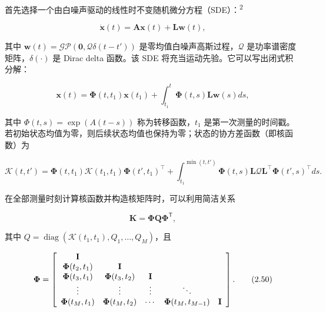 首先选择一个由白噪声驱动的线性时不变随机微分方程（SDE）：\textsuperscript{2}

\begin{equation}
\dot {\boldsymbol {x}} (t) = \boldsymbol {A} \boldsymbol {x} (t) + \boldsymbol {L} \boldsymbol {w} (t),\tag{2.46}
\end{equation}

其中 $\pmb w(t)=\mathcal{GP}(\mathbf0,\pmb{\mathcal{Q}}\delta(t-t'))$ 是零均值白噪声高斯过程，$\pmb{\mathcal{Q}}$ 是功率谱密度矩阵，$\delta(\cdot)$ 是 Dirac delta 函数。该 SDE 将充当运动先验。它可以写出闭式积分解：

\begin{equation}
\boldsymbol {x} (t) = \boldsymbol {\Phi} (t, t _ {1}) \boldsymbol {x} (t _ {1}) + \int_ {t _ {1}} ^ {t} \boldsymbol {\Phi} (t, s) \boldsymbol {L} \boldsymbol {w} (s) d s,\tag{2.47}
\end{equation}

其中 $\Phi(t,s)=\exp(A(t-s))$ 称为转移函数，$t_1$ 是第一次测量的时间戳。若初始状态均值为零，则后续状态均值也保持为零；状态的协方差函数（即核函数）为

\begin{equation}
\boldsymbol {\mathcal {K}} (t, t') = \boldsymbol {\Phi} (t, t _ {1}) \boldsymbol {\mathcal {K}} (t _ {1}, t _ {1}) \boldsymbol {\Phi} (t', t _ {1}) ^ {\top} + \int_ {t _ {1}} ^ {\min (t, t')} \boldsymbol {\Phi} (t, s) \boldsymbol {L} \boldsymbol {\mathcal{Q}} \boldsymbol {L} ^ {\top} \boldsymbol {\Phi} (t', s) ^ {\top} d s.\tag{2.48}
\end{equation}

在全部测量时刻计算核函数并构造核矩阵时，可以利用简洁关系

\begin{equation}
\boldsymbol {K} = \boldsymbol {\Phi} \boldsymbol {Q} \boldsymbol {\Phi} ^ {\mathsf T},\tag{2.49}
\end{equation}

其中 $Q=\operatorname{diag}(\mathcal{K}(t_1,t_1),Q_1,\ldots,Q_M)$，且

\begin{equation}
\boldsymbol {\Phi} = \left[ \begin{array}{c c c c c} \mathbf {I} & & & & \\ \boldsymbol {\Phi} (t _ {2}, t _ {1}) & \mathbf {I} & & & \\ \boldsymbol {\Phi} (t _ {3}, t _ {1}) & \boldsymbol {\Phi} (t _ {3}, t _ {2}) & \mathbf {I} & & \\ \vdots & \vdots & \vdots & \ddots & \\ \boldsymbol {\Phi} (t _ {M}, t _ {1}) & \boldsymbol {\Phi} (t _ {M}, t _ {2}) & \cdots & \boldsymbol {\Phi} (t _ {M}, t _ {M-1}) & \mathbf {I} \end{array} \right].\tag{2.50}
\end{equation}

